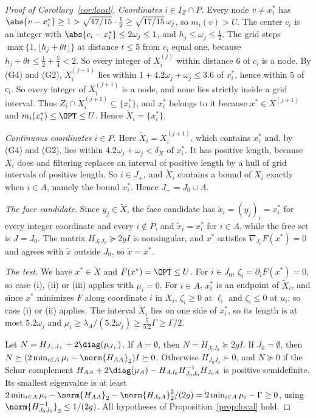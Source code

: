 \begin{proof}[Proof of Corollary~\ref{cor:local}]
\emph{Coordinates $i\in I_Z\cap P$.} Every node $v\ne x^*_i$ has
$\abs{v-x^*_i}\ge1>\sqrt{17/15}\cdot\frac12\ge\sqrt{17/15}\,\omega_j$, so
$m_i(v)>U$. The center $c_i$ is an integer with $\abs{c_i-x^*_i}\le2\omega_j\le1$,
and $h_j\le\omega_j\le\frac12$. The grid steps
$\max\{1,\lfloor h_j+\theta t\rfloor\}$ at distance $t\le5$ from $c_i$ equal
one, because $h_j+\theta t\le\frac12+\frac54<2$. So every integer of
$X^{(j)}_i$ within distance $6$ of $c_i$ is a node. By (G4) and (G2),
$X^{(j+1)}_i$ lies within $1+4.2\omega_j+\omega_j\le3.6$ of $x^*_i$, hence within
$5$ of $c_i$. So every integer of $X^{(j+1)}_i$ is a node, and none lies
strictly inside a grid interval. Thus
$Z_i\cap X^{(j+1)}_i\subseteq\{x^*_i\}$, and $x^*_i$ belongs to it because
$x^*\in X^{(j+1)}$ and $m_i(x^*_i)\le\OPT\le U$. Hence $\tilde X_i=\{x^*_i\}$.

\emph{Continuous coordinates $i\in P$.} Here $\tilde X_i=X^{(j+1)}_i$, which
contains $x^*_i$ and, by (G4) and (G2), lies within
$4.2\omega_j+\omega_j<\delta_X$ of $x^*_i$. It has positive length, because
$X_i$ does and filtering replaces an interval of positive length by a hull of
grid intervals of positive length. So $i\in J_+$, and
$\tilde X_i$ contains a bound of $X_i$ exactly when $i\in A$, namely
the bound $x^*_i$. Hence $J_+=J_0\cup A$.

\emph{The face candidate.} Since $y_j\in\tilde X$, the face candidate has
$\tilde x_i=(y_j)_i=x^*_i$ for every integer coordinate and every $i\notin P$,
and $\tilde x_i=x^*_i$ for $i\in A$, while the free set is $J=J_0$.
The matrix $H_{J_0J_0}\succeq2gI$ is nonsingular, and $x^*$ satisfies
$\nabla_{J_0}F(x^*)=0$ and agrees with $\tilde x$ outside $J_0$, so
$\tilde x=x^*$.

\emph{The test.} We have $x^*\in\tilde X$ and $F(x^*)=\OPT\le U$. For
$i\in J_0$, $\zeta_i=\partial_iF(x^*)=0$, so case (i), (ii) or (iii) applies
with $\mu_i=0$. For $i\in A$, $x^*_i$ is an endpoint of $\tilde X_i$,
and since $x^*$ minimizes $F$ along coordinate $i$ in $X_i$, $\zeta_i\ge0$ at
$\ell_i$ and $\zeta_i\le0$ at $u_i$; so case (i) or (ii) applies. The interval
$\tilde X_i$ lies on one side of $x^*_i$, so its length is at most $5.2\omega_j$
and $\mu_i\ge\lambda_A/(5.2\omega_j)\ge\frac{5}{5.2}\Gamma\ge\Gamma/2$.

Let $N=H_{J_+J_+}+2\diag(\mu_{J_+})$. If $A=\emptyset$, then
$N=H_{J_0J_0}\succeq2gI$. If $J_0=\emptyset$, then
$N\succeq(2\min_{i\in A}\mu_i-\norm{H_{AA}}_2)I\succeq0$.
Otherwise $H_{J_0J_0}\succ0$, and $N\succeq0$ if the Schur complement
$H_{AA}+2\diag(\mu_{A})
-H_{AJ_0}H_{J_0J_0}^{-1}H_{J_0A}$ is positive semidefinite.
Its smallest eigenvalue is at least
$2\min_{i\in A}\mu_i-\norm{H_{AA}}_2
-\norm{H_{J_0A}}_2^2/(2g)=2\min_{i\in A}\mu_i-\Gamma\ge0$, using
$\norm{H_{J_0J_0}^{-1}}_2\le1/(2g)$. All hypotheses of
Proposition~\ref{prop:local} hold.


\end{proof}
